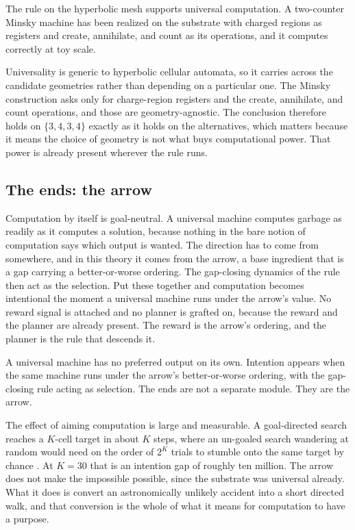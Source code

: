 \begin{proposition}
The rule on the hyperbolic mesh supports universal computation. A two-counter Minsky machine has been realized on
the substrate with charged regions as registers and create, annihilate, and count as its operations, and it
computes correctly at toy scale.
\end{proposition}

Universality is generic to hyperbolic cellular automata, so it carries across the candidate geometries rather than
depending on a particular one. The Minsky construction asks only for charge-region registers and the create,
annihilate, and count operations, and those are geometry-agnostic. The conclusion therefore holds on $\{3,4,3,4\}$
exactly as it holds on the alternatives, which matters because it means the choice of geometry is not what buys
computational power. That power is already present wherever the rule runs.

\subsection{The ends: the arrow}

Computation by itself is goal-neutral. A universal machine computes garbage as readily as it computes a solution,
because nothing in the bare notion of computation says which output is wanted. The direction has to come from
somewhere, and in this theory it comes from the arrow, a base ingredient that is a gap carrying a
better-or-worse ordering. The gap-closing dynamics of the rule then act as the selection. Put these together and
computation becomes intentional the moment a universal machine runs under the arrow's value. No reward signal is
attached and no planner is grafted on, because the reward and the planner are already present. The reward is the
arrow's ordering, and the planner is the rule that descends it.

\begin{principle}
A universal machine has no preferred output on its own. Intention appears when the same machine runs under the
arrow's better-or-worse ordering, with the gap-closing rule acting as selection. The ends are not a separate
module. They are the arrow.
\end{principle}

The effect of aiming computation is large and measurable. A goal-directed search reaches a $K$-cell target in
about $K$ steps, where an un-goaled search wandering at random would need on the order of $2^K$ trials to stumble
onto the same target by chance \cite{pollard2026vibetest}. At $K = 30$ that is an intention gap of roughly ten
million. The arrow does not make the impossible possible, since the substrate was universal already. What it does
is convert an astronomically unlikely accident into a short directed walk, and that conversion is the whole of
what it means for computation to have a purpose.

